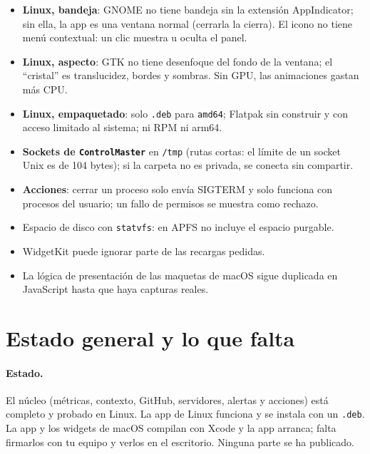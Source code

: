 \documentclass[11pt,a4paper]{article}
\begin{document}
\begin{itemize}
    servidor que pide contraseña o 2FA aparece como clave rechazada
    (y no como ``caído'').
  \item \textbf{Linux, bandeja}: GNOME no tiene bandeja sin la
    extensión AppIndicator; sin ella, la app es una ventana normal
    (cerrarla la cierra). El icono no tiene menú contextual: un clic
    muestra u oculta el panel.
  \item \textbf{Linux, aspecto}: GTK no tiene desenfoque del fondo de
    la ventana; el ``cristal'' es translucidez, bordes y sombras. Sin
    GPU, las animaciones gastan más CPU.
  \item \textbf{Linux, empaquetado}: solo \texttt{.deb} para
    \texttt{amd64}; Flatpak sin construir y con acceso limitado al
    sistema; ni RPM ni arm64.
  \item \textbf{Sockets de \texttt{ControlMaster}} en \texttt{/tmp}
    (rutas cortas: el límite de un socket Unix es de 104 bytes); si la
    carpeta no es privada, se conecta sin compartir.
  \item \textbf{Acciones}: cerrar un proceso solo envía SIGTERM y
    solo funciona con procesos del usuario; un fallo de permisos se
    muestra como rechazo.
  \item Espacio de disco con \texttt{statvfs}: en APFS no incluye el
    espacio purgable.
  \item WidgetKit puede ignorar parte de las recargas pedidas.
  \item La lógica de presentación de las maquetas de macOS sigue
    duplicada en JavaScript hasta que haya capturas reales.
\end{itemize}

\section{Estado general y lo que falta}\label{sec:estado}
\paragraph{Estado.} El núcleo (métricas, contexto, GitHub,
servidores, alertas y acciones) está completo y probado en Linux. La
app de Linux funciona y se instala con un \texttt{.deb}. La app y los
widgets de macOS compilan con Xcode y la app arranca; falta firmarlos
con tu equipo y verlos en el escritorio. Ninguna parte se ha publicado.
\end{document}
